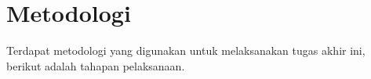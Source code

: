 \section{Metodologi}

Terdapat metodologi yang digunakan untuk melaksanakan tugas akhir ini, berikut adalah tahapan pelaksanaan.

